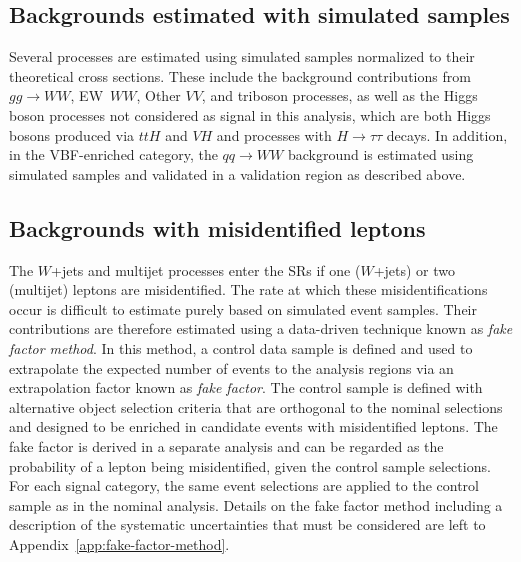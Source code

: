 \subsection{Backgrounds estimated with simulated samples}
Several processes are estimated using simulated samples normalized to their theoretical cross sections.
These include the background contributions from $gg \to WW$, EW~$WW$, Other $VV$, and triboson processes, as well as the Higgs boson processes not considered as signal in this analysis, which are both Higgs bosons produced via $ttH$ and $VH$ and processes with $H\to\tau\tau$ decays. In addition, in the VBF-enriched \TwoJet category, the $qq \to WW$ background is estimated using simulated samples and validated in a validation region as described above.

\subsection{Backgrounds with misidentified leptons}
\label{subsec:misid-bkg}
The $W$+jets and multijet processes enter the SRs if one ($W$+jets) or two (multijet) leptons are misidentified.
The rate at which these misidentifications occur is difficult to estimate purely based on simulated event samples.
Their contributions are therefore estimated using a data-driven technique known as \emph{fake factor method}. In this method, a control data sample is defined and used to extrapolate the expected number of events to the analysis regions via an extrapolation factor known as \emph{fake factor}.
The control sample is defined with alternative object selection criteria that are orthogonal to the nominal selections and designed to be enriched in candidate events with misidentified leptons.
The fake factor is derived in a separate analysis and can be regarded as the probability of a lepton being misidentified, given the control sample selections.
For each signal category, the same event selections are applied to the control sample as in the nominal analysis. Details on the fake factor method including a description of the systematic uncertainties that must be considered are left to Appendix~\ref{app:fake-factor-method}.



